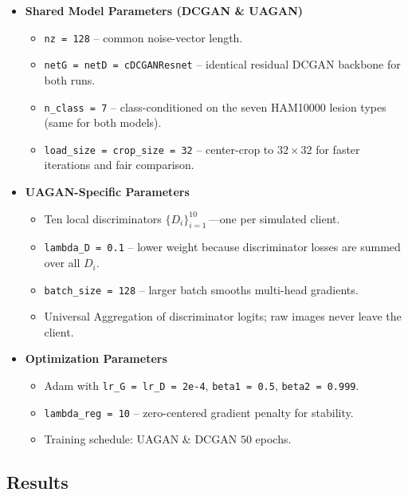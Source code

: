 \documentclass{article}
\begin{document}
\begin{itemize}
\item \textbf{Shared Model Parameters (DCGAN \& UAGAN)}
  \begin{itemize}
    \item \texttt{nz = 128} – common noise-vector length. 
    \item \texttt{netG = netD = cDCGANResnet} – identical residual DCGAN backbone for both runs. 
    \item \texttt{n\_class = 7} – class-conditioned on the seven HAM10000 lesion types (same for both models). 
    \item \texttt{load\_size = crop\_size = 32} – center-crop to \(32\times32\) for faster iterations and fair comparison.
  \end{itemize}

\item \textbf{UAGAN-Specific Parameters}
  \begin{itemize}
    \item Ten local discriminators \(\{D_i\}_{i=1}^{10}\)\,—one per simulated client. 
    \item \texttt{lambda\_D = 0.1} – lower weight because discriminator losses are summed over all \(D_i\). 
    \item \texttt{batch\_size = 128} – larger batch smooths multi-head gradients. 
    \item Universal Aggregation of discriminator logits; raw images never leave the client.
  \end{itemize}

\item \textbf{Optimization Parameters}
  \begin{itemize}
    \item Adam with \texttt{lr\_G = lr\_D = 2e-4}, \texttt{beta1 = 0.5}, \texttt{beta2 = 0.999}. 
    \item \texttt{lambda\_reg = 10} – zero-centered gradient penalty for stability. 
    \item Training schedule: UAGAN \& DCGAN \(50\) epochs.
  \end{itemize}


\end{itemize}


\subsection{Results}
\end{document}
